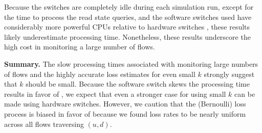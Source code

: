 Because the switches are completely idle during each simulation run, except for the time to process the read state queries, and the software switches used have
considerably more powerful CPUs relative to hardware switches \cite{Curtis11,Rotsos12}, these results likely underestimate processing time.  
Nonetheless, these results underscore the high cost in monitoring a large number of flows. 


{\bf Summary.}
The slow processing times associated with monitoring large numbers of flows and the highly accurate loss estimates for even small $k$ strongly suggest that $k$ should be small.
Because the software switch skews the processing time results in favor of \pcnts, we expect that even a stronger case for using small $k$ can be made using hardware switches.
However, we caution that the (Bernoulli) loss process is biased in favor of \pcnt because we found loss rates to be nearly uniform across all flows traversing $(u,d)$.


